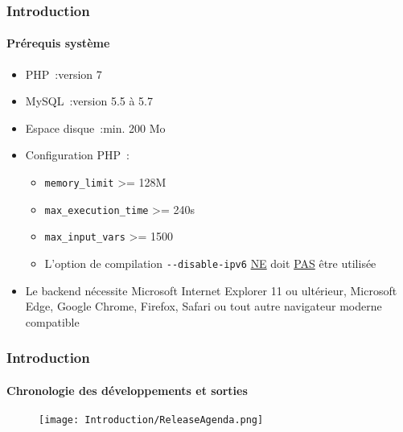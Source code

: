 \begin{frame}[fragile]
	\frametitle{Introduction}
	\framesubtitle{Prérequis système}

	\begin{itemize}
		\item PHP~:\tabto{2.5cm}version 7
		\item MySQL~:\tabto{2.5cm}version 5.5 à 5.7
		\item Espace disque~:\tabto{2.5cm}min. 200 Mo
		\item Configuration PHP~:

			\begin{itemize}
				\item \texttt{memory\_limit} >= 128M
				\item \texttt{max\_execution\_time} >= 240s
				\item \texttt{max\_input\_vars} >= 1500
				\item L'option de compilation \texttt{-}\texttt{-disable-ipv6} \underline{NE} doit \underline{PAS} être utilisée
			\end{itemize}

		\item Le backend nécessite Microsoft Internet Explorer 11 ou ultérieur,
			Microsoft Edge, Google Chrome, Firefox, Safari ou tout autre navigateur
			moderne compatible

	\end{itemize}

\end{frame}

\begin{frame}[fragile]
	\frametitle{Introduction}
	\framesubtitle{Chronologie des développements et sorties}

	\begin{figure}
		\texttt{[image: Introduction/ReleaseAgenda.png]}
	\end{figure}

\end{frame}

